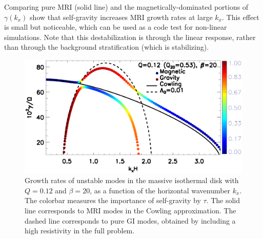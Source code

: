 Comparing pure MRI (solid line) and the magnetically-dominated
portions of $\gamma(k_x)$ show that self-gravity increases MRI growth
rates at large $k_x$. This effect is small but noticeable, which can
be used as a code test for non-linear simulations. Note that this
destabilization is through the linear response, rather 
than through the background stratification (which is stabilizing).  


\begin{figure}
  \includegraphics[width=\linewidth]{figures/compare_growth3_Q0d12_B20.ps}  
  \caption{Growth rates of unstable modes in the massive isothermal
    disk with $Q=0.12$ and $\beta=20$, as a function of the horizontal
    wavenumber $k_x$. The colorbar measures the importance of
    self-gravity by $\tau$. The solid line corresponds to MRI modes in the
    Cowling approximation. The dashed line corresponds to pure GI
    modes, obtained by including a high resistivity in the full
    problem. 
    \label{compare_growth3_Q01d2}}
\end{figure}

